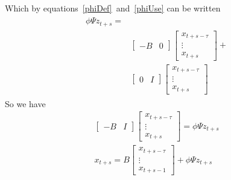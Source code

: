 \documentclass{elsart}
\begin{document}
\begin{prf}
\begin{gather}
  \end{gather}
Which by equations~\ref{phiDef}~and~\ref{phiUse} can be written
\begin{gather}
  \begin{split}
\phi\Psi z_{t+s}=&\\
&\begin{bmatrix} -B&0\end{bmatrix}  \begin{bmatrix}
    x_{t+s-\tau}\\\vdots\\x_{t+s}
  \end{bmatrix}+\\
& \begin{bmatrix}
    0&I  \end{bmatrix}  \begin{bmatrix}
    x_{t+s-\tau}\\\vdots\\x_{t+s}
  \end{bmatrix}
  \end{split}
  \end{gather}
So we have
  \begin{gather}
  \begin{bmatrix}
    -B&I
  \end{bmatrix}
\begin{bmatrix}
    x_{t+s-\tau}\\\vdots\\x_{t+s}
  \end{bmatrix}= \phi\Psi z_{t+s}\\
x_{t+s} = B \begin{bmatrix}
    x_{t+s-\tau}\\\vdots\\x_{t+s-1} 
  \end{bmatrix}+\phi\Psi z_{t+s}
\end{gather}


\end{prf}
\end{document}

